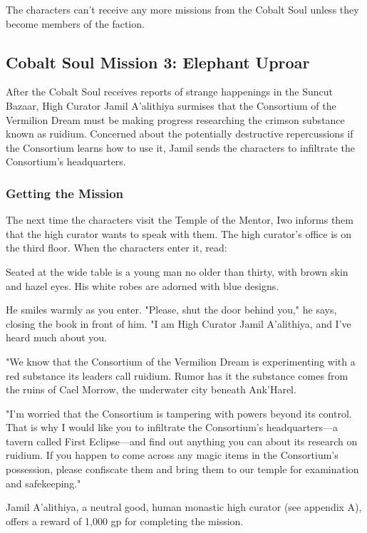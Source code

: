 \documentclass[10pt,a4paper,twoside,bg=print,twocolumn,openany,nodeprecatedcode]{dndbook}
\begin{document}
The characters can't receive any more missions from the Cobalt Soul unless they become members of the faction.

\subsection{Cobalt Soul Mission 3: Elephant Uproar}
After the Cobalt Soul receives reports of strange happenings in the Suncut Bazaar, High Curator Jamil A'alithiya surmises that the Consortium of the Vermilion Dream must be making progress researching the crimson substance known as ruidium. Concerned about the potentially destructive repercussions if the Consortium learns how to use it, Jamil sends the characters to infiltrate the Consortium's headquarters.

\subsubsection{Getting the Mission}
The next time the characters visit the Temple of the Mentor, Iwo informs them that the high curator wants to speak with them. The high curator's office is on the third floor. When the characters enter it, read:

\begin{DndReadAloud}{}
Seated at the wide table is a young man no older than thirty, with brown skin and hazel eyes. His white robes are adorned with blue designs.

He smiles warmly as you enter. "Please, shut the door behind you," he says, closing the book in front of him. "I am High Curator Jamil A'alithiya, and I've heard much about you.

"We know that the Consortium of the Vermilion Dream is experimenting with a red substance its leaders call ruidium. Rumor has it the substance comes from the ruins of Cael Morrow, the underwater city beneath Ank'Harel.

"I'm worried that the Consortium is tampering with powers beyond its control. That is why I would like you to infiltrate the Consortium's headquarters—a tavern called First Eclipse—and find out anything you can about its research on ruidium. If you happen to come across any magic items in the Consortium's possession, please confiscate them and bring them to our temple for examination and safekeeping."

\end{DndReadAloud}

Jamil A'alithiya, a neutral good, human monastic high curator (see appendix A), offers a reward of 1,000 gp for completing the mission.
\end{document}
